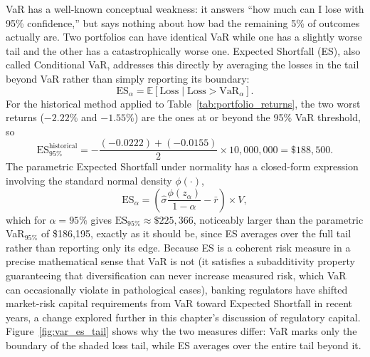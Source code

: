 \documentclass[../ai_in_finance]{subfiles}
\begin{document}
VaR has a well-known conceptual weakness: it answers ``how much can I lose with 95\% confidence,'' but says nothing about how bad the remaining 5\% of outcomes actually are. Two portfolios can have identical VaR while one has a slightly worse tail and the other has a catastrophically worse one. Expected Shortfall (ES), also called Conditional VaR, addresses this directly by averaging the losses in the tail beyond VaR rather than simply reporting its boundary:
\begin{equation*}
\text{ES}_\alpha = \mathbb{E}[\text{Loss} \mid \text{Loss} > \text{VaR}_\alpha].
\end{equation*}
For the historical method applied to Table~\ref{tab:portfolio_returns}, the two worst returns ($-2.22\%$ and $-1.55\%$) are the ones at or beyond the 95\% VaR threshold, so
\begin{equation*}
\text{ES}_{95\%}^{\text{historical}} = -\frac{(-0.0222) + (-0.0155)}{2} \times 10{,}000{,}000 = \$188{,}500.
\end{equation*}
The parametric Expected Shortfall under normality has a closed-form expression involving the standard normal density $\phi(\cdot)$,
\begin{equation*}
\text{ES}_\alpha = \left(\hat\sigma \frac{\phi(z_\alpha)}{1-\alpha} - \bar r\right) \times V,
\end{equation*}
which for $\alpha=95\%$ gives $\text{ES}_{95\%} \approx \$225{,}366$, noticeably larger than the parametric VaR$_{95\%}$ of \$186,195, exactly as it should be, since ES averages over the full tail rather than reporting only its edge.
Because ES is a coherent risk measure in a precise mathematical sense that VaR is not (it satisfies a subadditivity property guaranteeing that diversification can never increase measured risk, which VaR can occasionally violate in pathological cases), banking regulators have shifted market-risk capital requirements from VaR toward Expected Shortfall in recent years, a change explored further in this chapter's discussion of regulatory capital. Figure~\ref{fig:var_es_tail} shows why the two measures differ: VaR marks only the boundary of the shaded loss tail, while ES averages over the entire tail beyond it.
\end{document}
